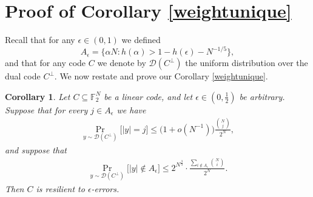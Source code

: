 \documentclass[12pt]{article}
\newtheorem*{corollary*}{Corollary}
\newcommand{\F}{\mathbb{F}}
\begin{document}
\section{Proof of Corollary \ref{weightunique}}\label{abinomialweight}
Recall that for any $\epsilon\in(0,1)$ we defined $$A_\epsilon=\{\alpha N:h(\alpha)>1-h(\epsilon)-N^{-1/5}\},$$
and that for any code $C$ we denote by $\mathcal{D}(C^\perp)$ the uniform distribution over the dual code $C^\perp$. We now restate and prove our Corollary \ref{weightunique}.
\begin{corollary*}
Let $C\subseteq\F_2^N$ be a linear code, and let $\epsilon\in(0,\frac{1}{2})$ be arbitrary.
Suppose that for every $j\in A_\epsilon$ we have
\begin{align*}
    \Pr_{y\sim\mathcal{D}(C^\perp)}\big[|y|=j\big]\leq \big( 1+o(N^{-1})  \big)\frac{\binom{N}{j}}{2^N},
\end{align*}
and suppose that
\begin{align*}
    \Pr_{y\sim\mathcal{D}(C^\perp)}\big[|y|\notin A_\epsilon\big]\leq 2^{N^{\frac{3}{4}}}\cdot \frac{\sum_{i\notin A_\epsilon}\binom{N}{i}}{2^N}.
\end{align*}
Then $C$ is resilient to $\epsilon$-errors.
\end{corollary*}
\end{document}
